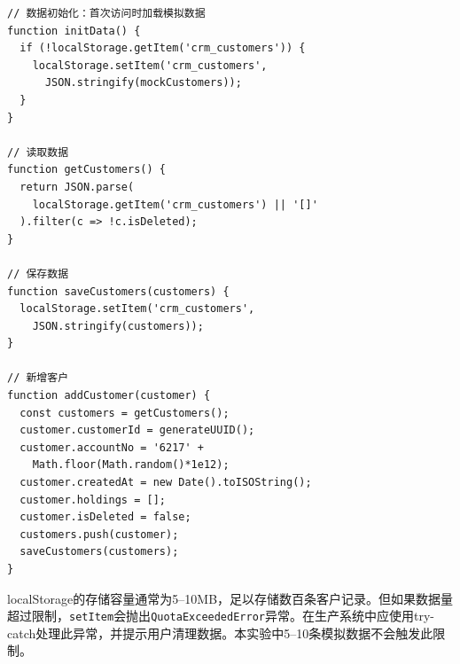\begin{lstlisting}[style=javascript]
// 数据初始化：首次访问时加载模拟数据
function initData() {
  if (!localStorage.getItem('crm_customers')) {
    localStorage.setItem('crm_customers',
      JSON.stringify(mockCustomers));
  }
}

// 读取数据
function getCustomers() {
  return JSON.parse(
    localStorage.getItem('crm_customers') || '[]'
  ).filter(c => !c.isDeleted);
}

// 保存数据
function saveCustomers(customers) {
  localStorage.setItem('crm_customers',
    JSON.stringify(customers));
}

// 新增客户
function addCustomer(customer) {
  const customers = getCustomers();
  customer.customerId = generateUUID();
  customer.accountNo = '6217' +
    Math.floor(Math.random()*1e12);
  customer.createdAt = new Date().toISOString();
  customer.holdings = [];
  customer.isDeleted = false;
  customers.push(customer);
  saveCustomers(customers);
}
\end{lstlisting}

\begin{warningbox}[localStorage的容量限制]
localStorage的存储容量通常为5--10MB，足以存储数百条客户记录。但如果数据量超过限制，\texttt{setItem}会抛出\texttt{QuotaExceededError}异常。在生产系统中应使用try-catch处理此异常，并提示用户清理数据。本实验中5--10条模拟数据不会触发此限制。
\end{warningbox}

